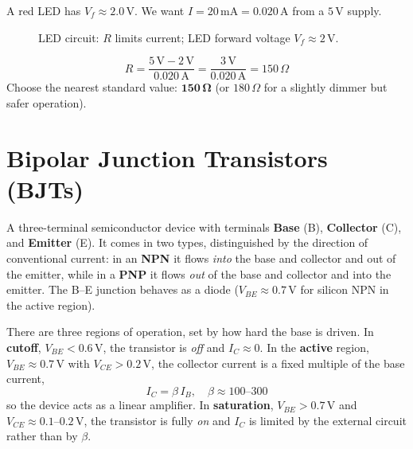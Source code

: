 \begin{example}
A red LED has $V_f \approx 2.0\,\text{V}$. We want $I = 20\,\text{mA} = 0.020\,\text{A}$ from a $5\,\text{V}$ supply.

\begin{figure}[H]
\begin{center}
\end{center}
\caption{LED circuit: $R$ limits current; LED forward voltage $V_f \approx 2\,\text{V}$.}
\end{figure}

\[
  R = \frac{5\,\text{V} - 2\,\text{V}}{0.020\,\text{A}} = \frac{3\,\text{V}}{0.020\,\text{A}} = 150\,\Omega
\]
Choose the nearest standard value: $\mathbf{150\,\Omega}$ (or $180\,\Omega$ for a slightly dimmer but safer operation).
\end{example}

\section{Bipolar Junction Transistors (BJTs)}

\begin{definition}
A three-terminal semiconductor device with terminals \textbf{Base} (B), \textbf{Collector} (C), and \textbf{Emitter} (E). It comes in two types, distinguished by the direction of conventional current: in an \textbf{NPN} it flows \emph{into} the base and collector and out of the emitter, while in a \textbf{PNP} it flows \emph{out} of the base and collector and into the emitter. The B--E junction behaves as a diode ($V_{BE} \approx 0.7\,\text{V}$ for silicon NPN in the active region).
\end{definition}

\begin{fact}
There are three regions of operation, set by how hard the base is driven. In \textbf{cutoff}, $V_{BE} < 0.6\,\text{V}$, the transistor is \emph{off} and $I_C \approx 0$. In the \textbf{active} region, $V_{BE} \approx 0.7\,\text{V}$ with $V_{CE} > 0.2\,\text{V}$, the collector current is a fixed multiple of the base current,
\[
  I_C = \beta\, I_B, \quad \beta \approx 100\text{--}300
\]
so the device acts as a linear amplifier. In \textbf{saturation}, $V_{BE} > 0.7\,\text{V}$ and $V_{CE} \approx 0.1$--$0.2\,\text{V}$, the transistor is fully \emph{on} and $I_C$ is limited by the external circuit rather than by $\beta$.
\end{fact}

